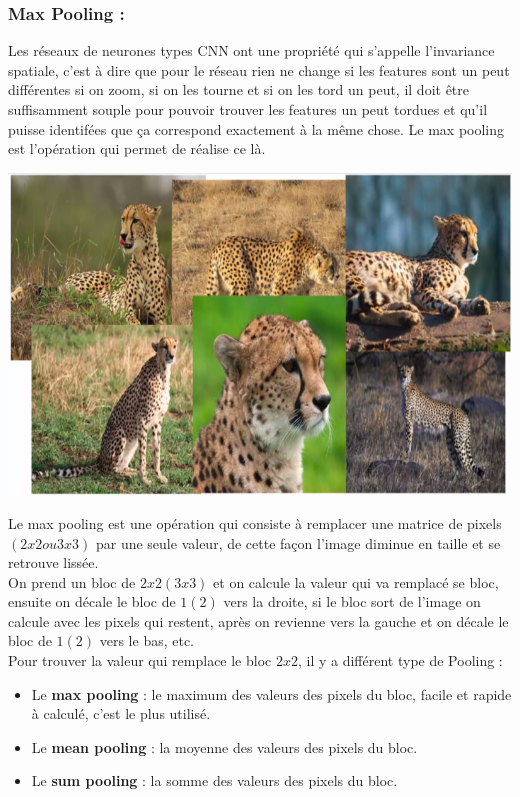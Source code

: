 \subsubsection{Max Pooling :}
Les réseaux de neurones types CNN ont une propriété qui s’appelle l’invariance spatiale, c’est à dire que pour le réseau rien ne change si les features sont un peut différentes si on zoom, si on les tourne et si on les tord un peut, il doit être suffisamment souple pour pouvoir trouver les features un peut tordues et qu’il puisse identifées que ça correspond exactement à la même chose. Le max pooling est l’opération qui permet de réalise ce là.

\begin{center}
	\includegraphics[scale=0.3]{img14.png}
\end{center}

Le max pooling est une opération qui consiste à remplacer une matrice de pixels $(2x2 ou 3x3)$ par une seule valeur, de cette façon l’image diminue en taille et se retrouve lissée.\\

On prend un bloc de $2x2 (3x3)$  et on calcule la valeur qui va remplacé se bloc, ensuite on décale le bloc de $1(2)$ vers la droite, si le bloc sort de l’image  on calcule  avec les pixels qui restent, après on revienne vers la gauche et on décale le bloc de $1(2)$ vers le bas, etc.\\

Pour trouver la valeur qui remplace le bloc $2x2$, il y a différent type de Pooling :

\begin{itemize}
\item Le \textbf{max pooling} : le maximum des valeurs des pixels du bloc, facile et rapide à calculé, c’est le plus utilisé.
\item Le \textbf{mean pooling} : la moyenne des valeurs des pixels du bloc.
\item Le \textbf{sum pooling} : la somme des valeurs des pixels du bloc.
\end{itemize}


